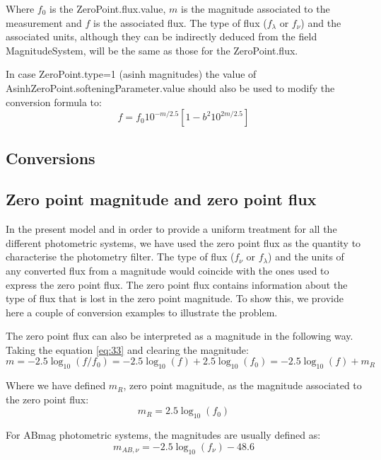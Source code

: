 \documentclass[11pt,a4paper]{ivoa}
\begin{document}
Where $f_0$ is the ZeroPoint.flux.value, $m$ is the magnitude associated to the
measurement and $f$ is the associated flux. The type of flux ($f_\lambda $ or $f_\nu $)
and the associated units, although they can be indirectly deduced from the field
MagnitudeSystem, will be the same as those for the ZeroPoint.flux.
\par
In case ZeroPoint.type=1 (asinh magnitudes) the value of
AsinhZeroPoint.softeningParameter.value should also be used to modify the conversion
formula to:
\begin{equation} \label{eq:34}
f = f_0 10^{-m/2.5}\left[ 1 - b^2 10^{2m/2.5}\right]
\end{equation}

\begin{appendices}
\section{Conversions}
\subsection{Zero point magnitude and zero point flux} \label{a.1conversion}
In the present model and in order to provide a uniform treatment for all the
different photometric systems, we have used the zero point flux as the quantity
to characterise the photometry filter. The type of flux ($f_\nu $ or $f_\lambda$)
and the units of any converted flux from a magnitude would coincide with the ones
used to express the zero point flux. The zero point flux contains information
about the type of flux that is lost in the zero point magnitude. To show this, we
provide here a couple of conversion examples to illustrate the problem.
\par
The zero point flux can also be interpreted as a magnitude in the following way.
Taking the equation \ref{eq:33} and clearing the magnitude:
\begin{equation} \label{eq:35}
m=-2.5\log_{10}(f/f_0 )=-2.5\log_{10}(f)+2.5\log_{10}(f_0 )=-2.5\log_{10} (f)+m_R
\end{equation}

Where we have defined $m_R$, zero point magnitude, as the magnitude associated to
the zero point flux:
\begin{equation} \label{eq:36}
m_R = 2.5\log_{10} (f_0 )
\end{equation} 
 
For ABmag photometric systems, the magnitudes are usually defined as:
\begin{equation} \label{eq:37}
m_{AB,\nu } = -2.5\log_{10} (f_\nu ) - 48.6
\end{equation}


\end{appendices}
\end{document}
